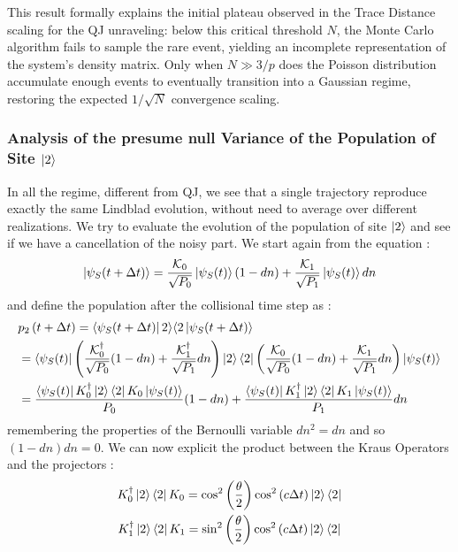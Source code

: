 \documentclass[a4paper,12pt]{article}
\begin{document}
This result formally explains the initial plateau observed in the Trace Distance scaling for the QJ unraveling: below this critical threshold $N$, the Monte Carlo algorithm fails to sample the rare event, yielding an incomplete representation of the system's density matrix. Only when $N \gg 3/p$ does the Poisson distribution accumulate enough events to eventually transition into a Gaussian regime, restoring the expected $1/\sqrt{N}$ convergence scaling.

\subsubsection{Analysis of the presume null Variance of the Population of Site $ \ket{2} $}
In all the regime, different from QJ, we  see that a single trajectory reproduce exactly the same Lindblad evolution, without need to average over different realizations. We try to evaluate the evolution of the population of site $ \ket{2} $ and see if we have a cancellation of the noisy part.
We start again from the equation : 
\begin{equation}
	\ket{\psi_{S}(t + \Delta t)} = \frac{\mathcal{K}_{0}}{\sqrt{P_{0}}} \ket{\psi_{S}(t)} (1 - dn) + \frac{\mathcal{K}_{1}}{\sqrt{P_{1}}} \ket{\psi_{S}(t)} dn
\end{equation}
and define the population after the collisional time step as : 
\begin{align}
	&p_{2} \left( t + \Delta t \right) = \bra{\psi_{S}(t + \Delta t)} 2 \rangle \langle 2 \ket{\psi_{S}(t + \Delta t)} \notag \\ 
	&= \bra{\psi_{S}(t)} \left( \frac{\mathcal{K}^{\dagger}_{0}}{\sqrt{P_{0}}}  (1 - dn) + \frac{\mathcal{K}^{\dagger}_{1}}{\sqrt{P_{1}} } dn\right) \ket{2} \bra{2} \left( \frac{\mathcal{K}_{0}}{\sqrt{P_{0}}} (1 - dn) + \frac{\mathcal{K}_{1}}{\sqrt{P_{1}}} dn \right) \ket{\psi_{S}(t)} \notag \\
	&= \frac{\bra{\psi_{S}(t)} {K}^{\dagger}_{0} \ket{2} \bra{2} {K}_{0} \ket{\psi_{S}(t)} }{P_{0}} (1-dn) + \frac{\bra{\psi_{S}(t)} {K}^{\dagger}_{1} \ket{2} \bra{2} {K}_{1} \ket{\psi_{S}(t)} }{P_{1}} dn
\end{align}
remembering the properties of the Bernoulli variable $ dn^{2} = dn $ and so $ (1-dn)dn = 0 $.
We can now explicit the product between the Kraus Operators and the projectors : 
\begin{gather}
	{K}^{\dagger}_{0} \ket{2} \bra{2} {K}_{0} = \cos^{2} \left( \frac{\theta}{2} \right) \cos^{2} \left( c \Delta t \right) \ket{2} \bra{2} \\
	{K}^{\dagger}_{1} \ket{2} \bra{2} {K}_{1} = \sin^{2} \left( \frac{\theta}{2} \right) \cos^{2} \left( c \Delta t \right) \ket{2} \bra{2} 
\end{gather}
\end{document}
